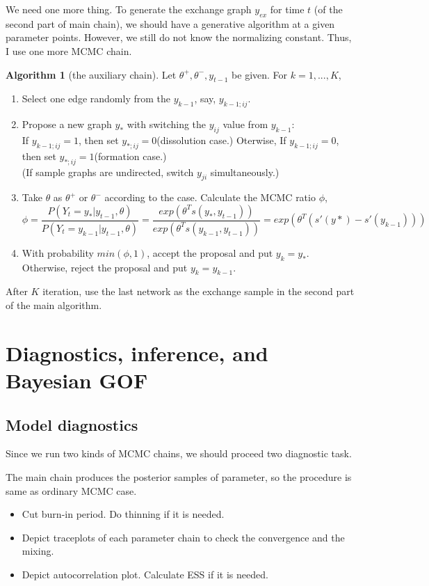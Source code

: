 \documentclass[aspectratio=169,ignorenonframetext,9pt]{beamer}
\theoremstyle{plain}
\theoremstyle{definition}
\newtheorem{algo}{Algorithm}[section]
\begin{document}
We need one more thing. To generate the exchange graph $y_{ex}$ for time $t$ (of the second part of main chain), 
we should have a generative algorithm at a given parameter points.
However, we still do not know the normalizing constant. Thus, I use one more MCMC chain.
\begin{algo}[the auxiliary chain]
Let $\theta^+,\theta^-,y_{t-1}$ be given. For $k=1,...,K$,
\begin{enumerate}
    \item Select one edge randomly from the $y_{k-1}$, say, $y_{k-1;ij}$.
    \item Propose a new graph $y_*$ with switching the $y_{ij}$ value from $y_{k-1}$: 
    \\ If $y_{k-1;ij}=1$, then set $y_{*;ij}=0$(dissolution case.) Oterwise, If $y_{k-1;ij}=0$, then set $y_{*;ij}=1$(formation case.)
    \\ (If sample graphs are undirected, switch $y_{ji}$ simultaneously.)
    \item Take $\theta$ as $\theta^+$ or $\theta^-$ according to the case. Calculate the MCMC ratio $\phi$,
    \[\phi = \frac{P(Y_t=y_*|y_{t-1},\theta)}{P(Y_t=y_{k-1}|y_{t-1},\theta)}= \frac{exp(\theta^T s(y_*,y_{t-1}))}{exp(\theta^T s(y_{k-1},y_{t-1}))} = exp(\theta^T (s'(y*)-s'(y_{k-1})))\]
    \item With probability $min(\phi,1)$, accept the proposal and put $y_k=y_*$.\\
        Otherwise, reject the proposal and put $y_k=y_{k-1}$.
\end{enumerate}
\end{algo}
After $K$ iteration, use the last network as the exchange sample in the second part of the main algorithm.


\section{Diagnostics, inference, and Bayesian GOF}



\subsection{Model diagnostics}
Since we run two kinds of MCMC chains, we should proceed two diagnostic task.

The main chain produces the posterior samples of parameter, so the procedure is same as ordinary MCMC case.
\begin{itemize}
    \item Cut burn-in period. Do thinning if it is needed.
    \item Depict traceplots of each parameter chain to check the convergence and the mixing.
    \item Depict autocorrelation plot. Calculate ESS if it is needed.
\end{itemize}
\end{document}
